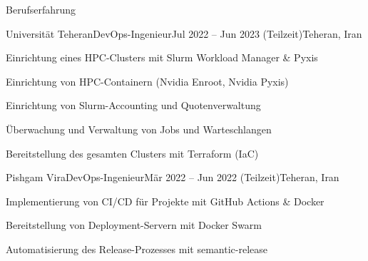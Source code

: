 \documentclass[]{main}
\begin{document}
\begin{section}{Berufserfahrung}
 \begin{subsection}{Universität Teheran}{DevOps-Ingenieur}{Jul 2022 -- Jun 2023 (Teilzeit)}{Teheran, Iran}
     \item Einrichtung eines HPC-Clusters mit Slurm Workload Manager \& Pyxis
     \item Einrichtung von HPC-Containern (Nvidia Enroot, Nvidia Pyxis)
     \item Einrichtung von Slurm-Accounting und Quotenverwaltung
     \item Überwachung und Verwaltung von Jobs und Warteschlangen
     \item Bereitstellung des gesamten Clusters mit Terraform (IaC)
 \end{subsection}

 \begin{subsection}{Pishgam Vira}{DevOps-Ingenieur}{Mär 2022 -- Jun 2022 (Teilzeit)}{Teheran, Iran}
     \item Implementierung von CI/CD für Projekte mit GitHub Actions \& Docker
     \item Bereitstellung von Deployment-Servern mit Docker Swarm
     \item Automatisierung des Release-Prozesses mit semantic-release
 \end{subsection}
\end{section}

\end{document}
